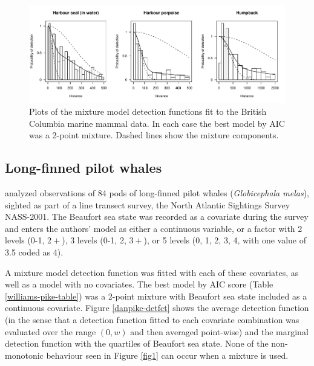 \documentclass[useAMS,referee,usenatbib]{biom}
\begin{document}
\begin{figure}
\centering
\includegraphics[width=\textwidth]{analyses/williamsplots.pdf}
\caption{Plots of the mixture model detection functions fit to the British Columbia marine mammal data. In each case the best model by AIC was a 2-point mixture. Dashed lines show the mixture components.}
\label{williams-detfcts}
\end{figure}

\subsection{Long-finned pilot whales}

\cite{Pike:2003ug} analyzed observations of 84 pods of long-finned pilot whales (\textit{Globicephala melas}), sighted as part of a line transect survey, the North Atlantic Sightings Survey NASS-2001. The Beaufort sea state was recorded as a covariate during the survey and enters the authors' model as either a continuous variable, or a factor with 2 levels (0-1, $2+$), 3 levels (0-1, 2, $3+$), or 5 levels (0, 1, 2, 3, 4, with one value of 3.5 coded as 4).

A mixture model detection function was fitted with each of these covariates, as well as a model with no covariates.  The best model by AIC score (Table \ref{williams-pike-table}) was a 2-point mixture with Beaufort sea state included as a continuous covariate. Figure \ref{danpike-detfct} shows the average detection function (in the sense that a detection function fitted to each covariate combination was evaluated over the range $(0,w)$ and then averaged point-wise) and the marginal detection function with the quartiles of Beaufort sea state. None of the non-monotonic behaviour seen in Figure \ref{fig1} can occur when a mixture is used.
\end{document}
